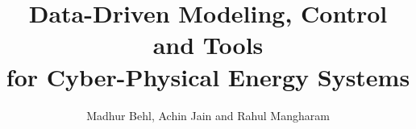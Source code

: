 \documentclass{sig-alternate-ipsn13}
\theoremstyle{definition}
\begin{document}
%
\title{Data-Driven Modeling, Control and Tools \\ for Cyber-Physical Energy Systems}


%
%
%
%
\author{
%
%
\alignauthor
 Madhur Behl, Achin Jain and Rahul Mangharam\\
       \\
}
\end{document}
